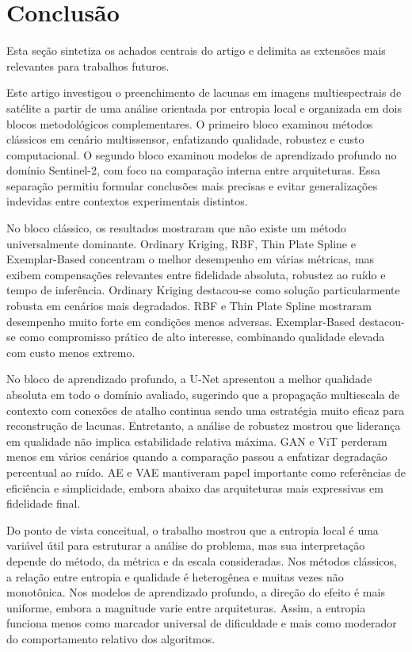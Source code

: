 \section{Conclusão}
\label{sec:conclusion}

Esta seção sintetiza os achados centrais do artigo e delimita as extensões mais relevantes para trabalhos futuros.

Este artigo investigou o preenchimento de lacunas em imagens multiespectrais de satélite a partir de uma análise orientada por entropia local e organizada em dois blocos metodológicos complementares.
O primeiro bloco examinou métodos clássicos em cenário multissensor, enfatizando qualidade, robustez e custo computacional.
O segundo bloco examinou modelos de aprendizado profundo no domínio Sentinel-2, com foco na comparação interna entre arquiteturas.
Essa separação permitiu formular conclusões mais precisas e evitar generalizações indevidas entre contextos experimentais distintos.

No bloco clássico, os resultados mostraram que não existe um método universalmente dominante.
Ordinary Kriging, \gls{RBF}, Thin Plate Spline e Exemplar-Based concentram o melhor desempenho em várias métricas, mas exibem compensações relevantes entre fidelidade absoluta, robustez ao ruído e tempo de inferência.
Ordinary Kriging destacou-se como solução particularmente robusta em cenários mais degradados.
\gls{RBF} e Thin Plate Spline mostraram desempenho muito forte em condições menos adversas.
Exemplar-Based destacou-se como compromisso prático de alto interesse, combinando qualidade elevada com custo menos extremo.

No bloco de aprendizado profundo, a U-Net apresentou a melhor qualidade absoluta em todo o domínio avaliado, sugerindo que a propagação multiescala de contexto com conexões de atalho continua sendo uma estratégia muito eficaz para reconstrução de lacunas.
Entretanto, a análise de robustez mostrou que liderança em qualidade não implica estabilidade relativa máxima.
\gls{GAN} e \gls{ViT} perderam menos em vários cenários quando a comparação passou a enfatizar degradação percentual ao ruído.
\gls{AE} e \gls{VAE} mantiveram papel importante como referências de eficiência e simplicidade, embora abaixo das arquiteturas mais expressivas em fidelidade final.

Do ponto de vista conceitual, o trabalho mostrou que a entropia local é uma variável útil para estruturar a análise do problema, mas sua interpretação depende do método, da métrica e da escala consideradas.
Nos métodos clássicos, a relação entre entropia e qualidade é heterogênea e muitas vezes não monotônica.
Nos modelos de aprendizado profundo, a direção do efeito é mais uniforme, embora a magnitude varie entre arquiteturas.
Assim, a entropia funciona menos como marcador universal de dificuldade e mais como moderador do comportamento relativo dos algoritmos.

